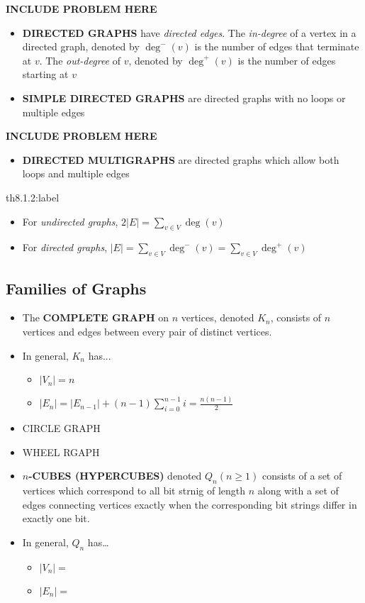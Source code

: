 \textbf{INCLUDE PROBLEM HERE}

\begin{itemize}
    \item \textbf{DIRECTED GRAPHS} have \textit{directed edges}. The \textit{in-degree} of a vertex in a directed graph, denoted by $\deg^-(v)$ is the number of edges that terminate at $v$. The \textit{out-degree} of $v$, denoted by $\deg^+(v)$ is the number of edges starting at $v$
    \item \textbf{SIMPLE DIRECTED GRAPHS} are directed graphs with no loops or multiple edges
\end{itemize}

\textbf{INCLUDE PROBLEM HERE}

\begin{itemize}
    \item \textbf{DIRECTED MULTIGRAPHS} are directed graphs which allow both loops and multiple edges
\end{itemize}


\begin{theorem}{th8.1.2:label}
    \begin{itemize}
        \item For \textit{undirected graphs}, $2|E| = \sum_{v\in V} \deg(v)$
        \item For \textit{directed graphs}, $|E| = \sum_{v\in V} \deg^-(v) = \sum_{v\in V} \deg^+(v)$
    \end{itemize}
\end{theorem}


\subsection{Families of Graphs}

\begin{itemize}
    \item The \textbf{COMPLETE GRAPH} on $n$ vertices, denoted $K_n$, consists of $n$ vertices and edges between every pair of distinct vertices.
    \item In general, $K_n$ has...
    \begin{itemize}
        \item $|V_n| = n$
        \item $|E_n| = |E_{n-1}| + (n-1) \sum_{i=0}^{n-1}i = \frac{n(n-1)}{2}$
    \end{itemize} 
    \item CIRCLE GRAPH
    \item WHEEL RGAPH
    \item \textbf{$n$-CUBES (HYPERCUBES)} denoted $Q_n(n\ge 1)$ consists of a set of vertices which correspond to all bit strnig of length $n$ along with a set of edges connecting vertices exactly when the corresponding bit strings differ in exactly one bit.
    \item In general, $Q_n$ has\dots
    \begin{itemize}
        \item $|V_n| = $
        \item $|E_n| = $
    \end{itemize}
\end{itemize}



